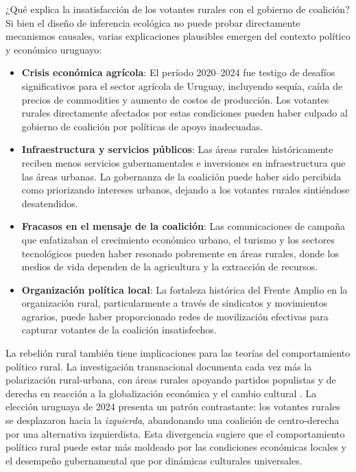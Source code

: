 ¿Qué explica la insatisfacción de los votantes rurales con el gobierno de coalición? Si bien el diseño de inferencia ecológica no puede probar directamente mecanismos causales, varias explicaciones plausibles emergen del contexto político y económico uruguayo:

\begin{itemize}
    \item \textbf{Crisis económica agrícola}: El período 2020--2024 fue testigo de desafíos significativos para el sector agrícola de Uruguay, incluyendo sequía, caída de precios de commodities y aumento de costos de producción. Los votantes rurales directamente afectados por estas condiciones pueden haber culpado al gobierno de coalición por políticas de apoyo inadecuadas.

    \item \textbf{Infraestructura y servicios públicos}: Las áreas rurales históricamente reciben menos servicios gubernamentales e inversiones en infraestructura que las áreas urbanas. La gobernanza de la coalición puede haber sido percibida como priorizando intereses urbanos, dejando a los votantes rurales sintiéndose desatendidos.

    \item \textbf{Fracasos en el mensaje de la coalición}: Las comunicaciones de campaña que enfatizaban el crecimiento económico urbano, el turismo y los sectores tecnológicos pueden haber resonado pobremente en áreas rurales, donde los medios de vida dependen de la agricultura y la extracción de recursos.

    \item \textbf{Organización política local}: La fortaleza histórica del Frente Amplio en la organización rural, particularmente a través de sindicatos y movimientos agrarios, puede haber proporcionado redes de movilización efectivas para capturar votantes de la coalición insatisfechos.
\end{itemize}

La rebelión rural también tiene implicaciones para las teorías del comportamiento político rural. La investigación transnacional documenta cada vez más la polarización rural-urbana, con áreas rurales apoyando partidos populistas y de derecha en reacción a la globalización económica y el cambio cultural \citep{rodden2019s}. La elección uruguaya de 2024 presenta un patrón contrastante: los votantes rurales se desplazaron hacia la \textit{izquierda}, abandonando una coalición de centro-derecha por una alternativa izquierdista. Esta divergencia sugiere que el comportamiento político rural puede estar más moldeado por las condiciones económicas locales y el desempeño gubernamental que por dinámicas culturales universales.

